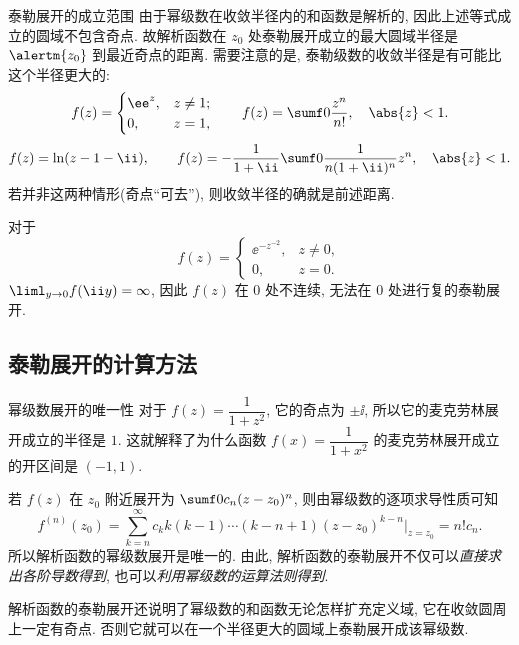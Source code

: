 \begin{frame}{泰勒展开的成立范围}
	\onslide<+->
	由于幂级数在收敛半径内的和函数是解析的, 因此上述等式成立的圆域不包含奇点.
	\onslide<+->
	故解析函数在 $z_0$ 处\alert{泰勒展开成立的最大圆域半径是 $\alertm{z_0}$ 到最近奇点的距离}.
	\onslide<+->
	需要注意的是, 泰勒级数的收敛半径是有可能比这个半径更大的:
	\[f(z)=\begin{cases}
	\ee^z,&z\neq 1;\\ 0,&z=1,
	\end{cases}\qquad f(z)=\sumf0 \dfrac{z^n}{n!},\quad \abs{z}<1.
	\]
	\onslide<+->
	\[f(z)=\ln(z-1-\ii ),\qquad f(z)=-\frac1{1+\ii}\sumf0\frac1{n(1+\ii)^n}z^n,\quad \abs{z}<1.
	\]
	\onslide<+->
	若并非这两种情形(奇点``可去''), 则收敛半径的确就是前述距离.

	\onslide<+->
	对于
	\[
		f(z)=\begin{cases}
		\ee^{-z^{-2}},&z\neq 0,\\
		0,&z=0.\end{cases}
	\]
	\onslide<+->
	$\liml_{y\to 0}f(\ii y)=\infty$, 因此 $f(z)$ 在 $0$ 处不连续, 无法在 $0$ 处进行复的泰勒展开.
\end{frame}


\subsection{泰勒展开的计算方法}
\begin{frame}{幂级数展开的唯一性}
	\onslide<+->
	对于 $f(z)=\dfrac1{1+z^2}$,
	\onslide<+->
	它的奇点为 $\pm \ii$, 所以它的麦克劳林展开成立的半径是 $1$.
	\onslide<+->
	这就解释了为什么函数 $f(x)=\dfrac1{1+x^2}$ 的麦克劳林展开成立的开区间是 $(-1,1)$.

	\onslide<+->
	若 $f(z)$ 在 $z_0$ 附近展开为 $\sumf0 c_n(z-z_0)^n$,
	\onslide<+->
	则由幂级数的逐项求导性质可知
	\[f^{(n)}(z_0)=\sum_{k=n}^\infty c_k k(k-1)\cdots(k-n+1)(z-z_0)^{k-n}\Big|_{z=z_0}=n!c_n.
	\]
	\onslide<+->
	所以\alert{解析函数的幂级数展开是唯一的}.
	\onslide<+->
	由此, 解析函数的泰勒展开不仅可以\emph{直接求出各阶导数得到}, 也可以\emph{利用幂级数的运算法则得到}.

	\onslide<+->
	解析函数的泰勒展开还说明了幂级数的和函数无论怎样扩充定义域, 它在\alert{收敛圆周上一定有奇点}.
	\onslide<+->
	否则它就可以在一个半径更大的圆域上泰勒展开成该幂级数.
\end{frame}


